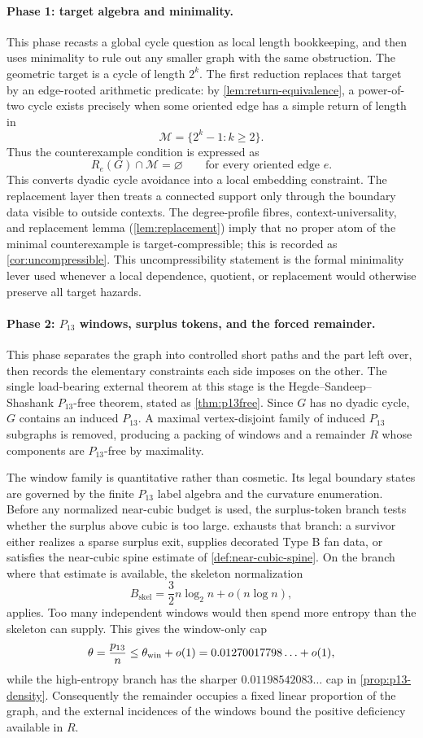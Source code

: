\documentclass[11pt]{article}
\newcommand{\Mers}{\mathcal M}
\begin{document}
\paragraph{Phase 1: target algebra and minimality.}
This phase recasts a global cycle question as local length bookkeeping, and
then uses minimality to rule out any smaller graph with the same obstruction.
The geometric target is a cycle of length $2^k$.  The first reduction replaces
that target by an edge-rooted arithmetic predicate: by
\cref{lem:return-equivalence}, a power-of-two cycle exists precisely when some
oriented edge has a simple return of length in
\[
\Mers=\{2^k-1:k\ge2\}.
\]
Thus the counterexample condition is expressed as
\[
R_e(G)\cap \Mers=\varnothing
\qquad\text{for every oriented edge }e .
\]
This converts dyadic cycle avoidance into a local embedding constraint.  The
replacement layer then treats a connected support only through the boundary
data visible to outside contexts.  The degree-profile fibres,
context-universality, and replacement lemma
(\cref{lem:replacement}) imply that no proper atom of the minimal
counterexample is target-compressible; this is recorded as
\cref{cor:uncompressible}.  This uncompressibility statement is the formal
minimality lever used whenever a local dependence, quotient, or replacement
would otherwise preserve all target hazards.

\paragraph{Phase 2: $P_{13}$ windows, surplus tokens, and the forced remainder.}
This phase separates the graph into controlled short paths and the part left
over, then records the elementary constraints each side imposes on the other.
The single load-bearing external theorem at this stage is the Hegde--Sandeep--Shashank
$P_{13}$-free theorem, stated as \cref{thm:p13free}.  Since $G$ has no dyadic
cycle, $G$ contains an induced $P_{13}$.  A maximal vertex-disjoint family of
induced $P_{13}$ subgraphs is removed, producing a packing of windows and a
remainder $R$ whose components are $P_{13}$-free by maximality.

The window family is quantitative rather than cosmetic.  Its legal boundary
states are governed by the finite $P_{13}$ label algebra and the curvature
enumeration.  Before any normalized near-cubic budget is used, the
surplus-token branch tests whether the surplus above cubic is too large.
 exhausts that branch: a
survivor either realizes a sparse surplus exit, supplies decorated Type B fan
data, or satisfies the near-cubic spine estimate of
\cref{def:near-cubic-spine}.  On the branch where that estimate is available,
the skeleton normalization
\[
B_{\mathrm{skel}}=\frac32 n\log_2 n+o(n\log n),
\]
applies.  Too many independent windows would then spend more entropy than the
skeleton can supply.  This gives the window-only cap
\[
\theta=\frac{p_{13}}{n}\le \theta_{\rm win}+o(1)
=0.01270017798\ldots+o(1),
\]
while the high-entropy branch has the sharper
$0.01198542083\ldots$ cap in \cref{prop:p13-density}.  Consequently the
remainder occupies a fixed linear proportion of the graph, and the external
incidences of the windows bound the positive deficiency available in $R$.
\end{document}
